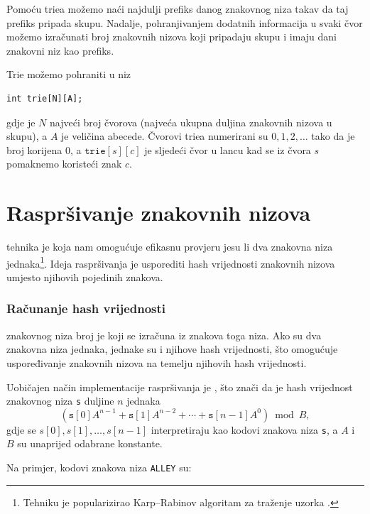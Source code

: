 Pomoću triea možemo naći
najdulji prefiks danog znakovnog niza
takav da taj prefiks pripada skupu.
Nadalje, pohranjivanjem dodatnih informacija
u svaki čvor
možemo izračunati broj
znakovnih nizova koji pripadaju skupu i imaju
dani znakovni niz kao prefiks.

Trie možemo pohraniti u niz
\begin{lstlisting}
int trie[N][A];
\end{lstlisting}
gdje je $N$ najveći broj čvorova
(najveća ukupna duljina znakovnih nizova u skupu),
a $A$ je veličina abecede.
Čvorovi triea numerirani su
$0,1,2,\ldots$ tako da je broj korijena 0,
a $\texttt{trie}[s][c]$ je sljedeći čvor u lancu
kad se iz čvora $s$ pomaknemo koristeći znak $c$.

\section{Raspršivanje znakovnih nizova}


 tehnika je koja
nam omogućuje efikasnu provjeru jesu li dva
znakovna niza jednaka\footnote{Tehniku je
popularizirao Karp–Rabinov algoritam za traženje
uzorka \cite{kar87}.}.
Ideja raspršivanja je usporediti hash vrijednosti
znakovnih nizova umjesto njihovih pojedinih znakova.

\subsubsection*{Računanje hash vrijednosti}


 znakovnog niza
broj je koji se izračuna iz znakova
toga niza.
Ako su dva znakovna niza jednaka,
jednake su i njihove hash vrijednosti,
što omogućuje uspoređivanje znakovnih nizova
na temelju njihovih hash vrijednosti.

Uobičajen način implementacije raspršivanja
je , što znači
da je hash vrijednost znakovnog niza \texttt{s}
duljine $n$ jednaka
\[(\texttt{s}[0] A^{n-1} + \texttt{s}[1] A^{n-2} + \cdots + \texttt{s}[n-1] A^0) \bmod B  ,\]
gdje se $s[0],s[1],\ldots,s[n-1]$
interpretiraju kao kodovi znakova niza \texttt{s},
a $A$ i $B$ su unaprijed odabrane konstante.

Na primjer, kodovi znakova
niza \texttt{ALLEY} su:
\begin{center}
\end{center}


